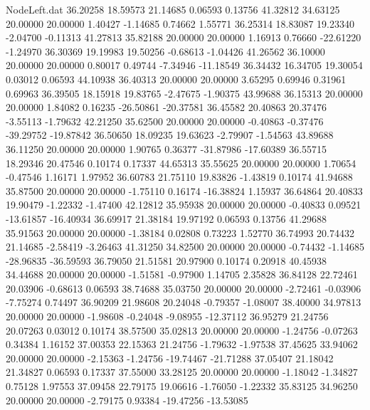 \begin{filecontents}{NodeLeft.dat}
  36.20258   18.59573   21.14685     0.06593    0.13756   41.32812   34.63125   20.00000   20.00000    1.40427   -1.14685    0.74662    1.55771
  36.25314   18.83087   19.23340    -2.04700   -0.11313   41.27813   35.82188   20.00000   20.00000    1.16913    0.76660  -22.61220   -1.24970
  36.30369   19.19983   19.50256    -0.68613   -1.04426   41.26562   36.10000   20.00000   20.00000    0.80017    0.49744   -7.34946  -11.18549
  36.34432   16.34705   19.30054     0.03012    0.06593   44.10938   36.40313   20.00000   20.00000    3.65295    0.69946    0.31961    0.69963
  36.39505   18.15918   19.83765    -2.47675   -1.90375   43.99688   36.15313   20.00000   20.00000    1.84082    0.16235  -26.50861  -20.37581
  36.45582   20.40863   20.37476    -3.55113   -1.79632   42.21250   35.62500   20.00000   20.00000   -0.40863   -0.37476  -39.29752  -19.87842
  36.50650   18.09235   19.63623    -2.79907   -1.54563   43.89688   36.11250   20.00000   20.00000    1.90765    0.36377  -31.87986  -17.60389
  36.55715   18.29346   20.47546     0.10174    0.17337   44.65313   35.55625   20.00000   20.00000    1.70654   -0.47546    1.16171    1.97952
  36.60783   21.75110   19.83826    -1.43819    0.10174   41.94688   35.87500   20.00000   20.00000   -1.75110    0.16174  -16.38824    1.15937
  36.64864   20.40833   19.90479    -1.22332   -1.47400   42.12812   35.95938   20.00000   20.00000   -0.40833    0.09521  -13.61857  -16.40934
  36.69917   21.38184   19.97192     0.06593    0.13756   41.29688   35.91563   20.00000   20.00000   -1.38184    0.02808    0.73223    1.52770
  36.74993   20.74432   21.14685    -2.58419   -3.26463   41.31250   34.82500   20.00000   20.00000   -0.74432   -1.14685  -28.96835  -36.59593
  36.79050   21.51581   20.97900     0.10174    0.20918   40.45938   34.44688   20.00000   20.00000   -1.51581   -0.97900    1.14705    2.35828
  36.84128   22.72461   20.03906    -0.68613    0.06593   38.74688   35.03750   20.00000   20.00000   -2.72461   -0.03906   -7.75274    0.74497
  36.90209   21.98608   20.24048    -0.79357   -1.08007   38.40000   34.97813   20.00000   20.00000   -1.98608   -0.24048   -9.08955  -12.37112
  36.95279   21.24756   20.07263     0.03012    0.10174   38.57500   35.02813   20.00000   20.00000   -1.24756   -0.07263    0.34384    1.16152
  37.00353   22.15363   21.24756    -1.79632   -1.97538   37.45625   33.94062   20.00000   20.00000   -2.15363   -1.24756  -19.74467  -21.71288
  37.05407   21.18042   21.34827     0.06593    0.17337   37.55000   33.28125   20.00000   20.00000   -1.18042   -1.34827    0.75128    1.97553
  37.09458   22.79175   19.06616    -1.76050   -1.22332   35.83125   34.96250   20.00000   20.00000   -2.79175    0.93384  -19.47256  -13.53085

\end{filecontents}
